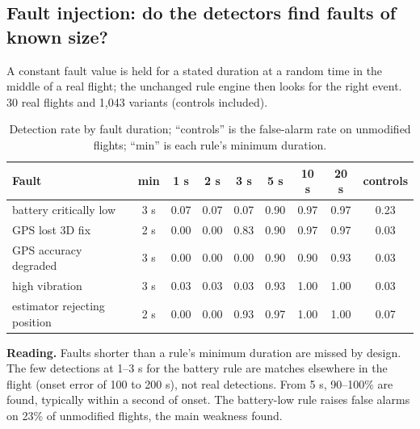 \documentclass[11pt,a4paper]{article}
\newcommand{\pgfaxis}[1]{\begin{axis}[width=0.85\linewidth,height=6.2cm,#1,grid=major,grid style={black!12},tick label style={font=\scriptsize},label style={font=\footnotesize},legend style={font=\scriptsize,at={(0.5,-0.22)},anchor=north,legend columns=3},cycle list={{blue!70!black,mark=*},{red!75!black,mark=square*},{green!45!black,mark=triangle*},{orange!85!black,mark=diamond*},{violet,mark=pentagon*}},every axis plot/.append style={thick,mark size=1.6pt}]}
\begin{document}
\subsection{Fault injection: do the detectors find faults of known size?}
A constant fault value is held for a stated duration at a random time in the middle of a real flight; the unchanged rule engine then looks for the right event. 30 real flights and 1,043 variants (controls included).
\begin{center}
\end{center}
\begin{table}[H]
\centering
\small
\begin{tabular}{lcccccccc}
\toprule
Fault & min & 1 s & 2 s & 3 s & 5 s & 10 s & 20 s & controls\\
\midrule
battery critically low & 3 s & 0.07 & 0.07 & 0.07 & 0.90 & 0.97 & 0.97 & 0.23\\
GPS lost 3D fix & 2 s & 0.00 & 0.00 & 0.83 & 0.90 & 0.97 & 0.97 & 0.03\\
GPS accuracy degraded & 3 s & 0.00 & 0.00 & 0.00 & 0.90 & 0.90 & 0.93 & 0.03\\
high vibration & 3 s & 0.03 & 0.03 & 0.03 & 0.93 & 1.00 & 1.00 & 0.03\\
estimator rejecting position & 2 s & 0.00 & 0.00 & 0.93 & 0.97 & 1.00 & 1.00 & 0.07\\
\bottomrule
\end{tabular}
\caption{Detection rate by fault duration; ``controls'' is the false-alarm rate on unmodified flights; ``min'' is each rule's minimum duration.}
\end{table}
\textbf{Reading.} Faults shorter than a rule's minimum duration are missed by design. The few detections at 1--3 s for the battery rule are matches elsewhere in the flight (onset error of 100 to 200 s), not real detections. From 5 s, 90--100\% are found, typically within a second of onset. The battery-low rule raises false alarms on 23\% of unmodified flights, the main weakness found.
\end{document}
